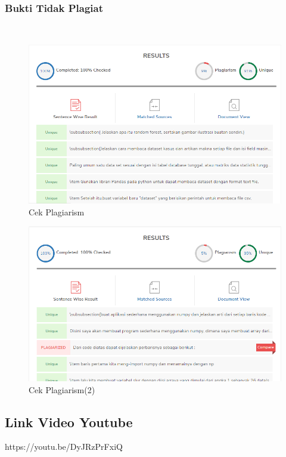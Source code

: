 \subsubsection{Bukti Tidak Plagiat}
\hfill\\
\begin{figure}[H]
	\centering
	\includegraphics[width=12cm]{figures/1174083/figures3/plagiat.png}
	\caption{Cek Plagiarism}
\end{figure}
\begin{figure}[H]
	\centering
	\includegraphics[width=12cm]{figures/1174083/figures3/plagiat1.png}	
	\caption{Cek Plagiarism(2)}
\end{figure}


\subsection{Link Video Youtube}
https://youtu.be/DyJRzPrFxiQ